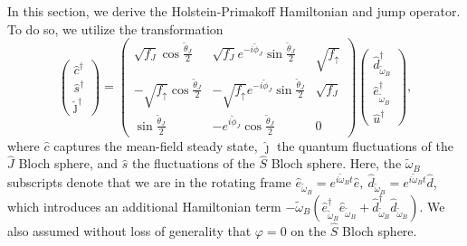 In this section, we derive the Holstein-Primakoff Hamiltonian and jump operator. To do so, we utilize the transformation 
\begin{equation}
    \left( 
    \begin{array}{c}
    \hat c^\dagger \\
    \hat s^\dagger \\
    \hat \jmath^\dagger 
    \end{array} 
    \right)
    = 
    \left(
    \begin{array}{ccc}
         \sqrt{f_J} \cos \frac{\tilde{\theta}_J}{2} & \sqrt{f_J} e^{-i \tilde{\phi}_J} \sin \frac{\tilde{\theta}_J}{2} & \sqrt{f_{\uparrow}} \\
         -\sqrt{f_{\uparrow}} \cos \frac{\tilde{\theta}_J}{2} & -\sqrt{f_{\uparrow}} e^{- i \tilde{\phi}_J} \sin \frac{\tilde{\theta}_J}{2} & \sqrt{f_J}\\
         \sin \frac{\tilde{\theta}_J}{2} & -e^{i \tilde{\phi}_J} \cos \frac{\tilde{\theta}_J}{2} & 0
    \end{array} \right)
    \left(
    \begin{array}{c}
        \hat d_{\tilde{\omega}_B}^\dagger \\
        \hat{e}_{\tilde{\omega}_B}^\dagger \\
        \hat u^\dagger     
    \end{array}
    \right),
\end{equation}
where $\hat c$ captures the mean-field steady state, $\hat \jmath$ the quantum fluctuations of the $\hat J$ Bloch sphere, and $\hat s$ the fluctuations of the $\hat S$ Bloch sphere. Here, the $\tilde{\omega}_B$ subscripts denote that we are in the rotating frame $\hat e_{\tilde{\omega}_B} = e^{i \tilde{\omega}_B t} \hat e, ~\hat d_{\tilde{\omega}_B} = e^{i \tilde{\omega}_B t} \hat d$, which introduces an additional Hamiltonian term $-\tilde{\omega}_B(\hat{e}^\dagger_{\tilde{\omega}_B} \hat{e}_{\tilde{\omega}_B} + \hat{d}^\dagger_{\tilde{\omega}_B} \hat{d}_{\tilde{\omega}_B})$. We also assumed without loss of generality that $\varphi = 0$ on the $\hat S$ Bloch sphere.

